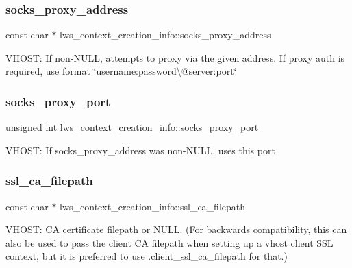 \subsubsection{\texorpdfstring{socks\+\_\+proxy\+\_\+address}{socks\_proxy\_address}}
{\footnotesize\ttfamily const char $\ast$ lws\+\_\+context\+\_\+creation\+\_\+info\+::socks\+\_\+proxy\+\_\+address}

V\+H\+O\+ST\+: If non-\/\+N\+U\+LL, attempts to proxy via the given address. If proxy auth is required, use format \char`\"{}username\+:password\textbackslash{}@server\+:port\char`\"{} \mbox{\label{structlws__context__creation__info_ae0f1e3d6c50337d2d93bfbf58c04c934}} 
\subsubsection{\texorpdfstring{socks\+\_\+proxy\+\_\+port}{socks\_proxy\_port}}
{\footnotesize\ttfamily unsigned int lws\+\_\+context\+\_\+creation\+\_\+info\+::socks\+\_\+proxy\+\_\+port}

V\+H\+O\+ST\+: If socks\+\_\+proxy\+\_\+address was non-\/\+N\+U\+LL, uses this port \mbox{\label{structlws__context__creation__info_a83e6833230eca2ff8b108563303c70c6}} 
\subsubsection{\texorpdfstring{ssl\+\_\+ca\+\_\+filepath}{ssl\_ca\_filepath}}
{\footnotesize\ttfamily const char $\ast$ lws\+\_\+context\+\_\+creation\+\_\+info\+::ssl\+\_\+ca\+\_\+filepath}

V\+H\+O\+ST\+: CA certificate filepath or N\+U\+LL. (For backwards compatibility, this can also be used to pass the client CA filepath when setting up a vhost client S\+SL context, but it is preferred to use .client\+\_\+ssl\+\_\+ca\+\_\+filepath for that.)

